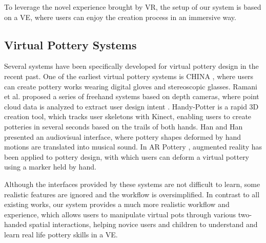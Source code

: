 \documentclass{svjour3}                     %
\begin{document}
To leverage the novel experience brought by VR, the setup of our system is based on a VE, where users can enjoy the creation process in an immersive way.

\subsection{Virtual Pottery Systems}
\label{sec:virtual}


Several systems have been specifically developed for virtual pottery design in the recent past.
One of the earliest virtual pottery systems is CHINA \cite{korida1997interactive}, where users can create pottery works wearing digital gloves and stereoscopic glasses.
Ramani et al. proposed a series of freehand systems based on depth cameras, where point cloud data is analyzed to extract user design intent \cite{ramani2014zpots,ramani2015gesture,ramani2016extracting}.
Handy-Potter \cite{murugappan2013handy} is a rapid 3D creation tool, which tracks user skeletons with Kinect, enabling users to create potteries in several seconds based on the trails of both hands.
Han and Han \cite{han2014virtual} presented an audiovisual interface, where pottery shapes deformed by hand motions are translated into musical sound.
In AR Pottery \cite{han2007ar}, augmented reality has been applied to pottery design, with which users can deform a virtual pottery using a marker held by hand.

Although the interfaces provided by these systems are not difficult to learn, some realistic features are ignored and the workflow is oversimplified.
In contrast to all existing works, our system provides a much more realistic workflow and experience, which allows users to manipulate virtual pots through various two-handed spatial interactions, helping novice users and children to understand and learn real life pottery skills in a VE.
\end{document}
